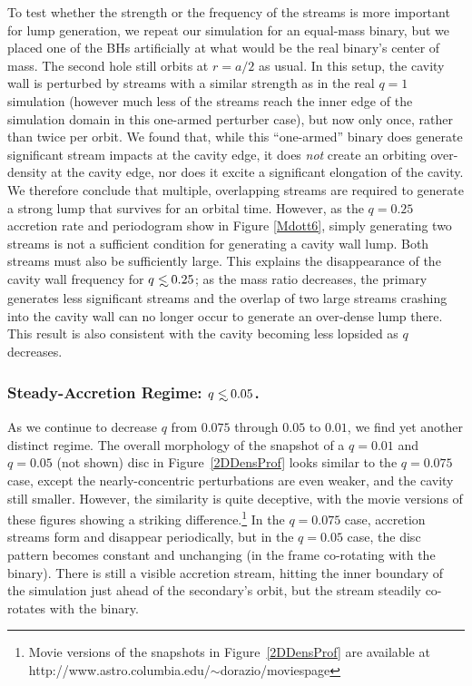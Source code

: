 To test whether the strength or the frequency of the streams is more
important for lump generation, we repeat our simulation for an
equal-mass binary, but we placed one of the BHs artificially at what
would be the real binary's center of mass. The second hole still
orbits at $r=a/2$ as usual.  In this setup, the cavity wall is
perturbed by streams with a similar strength as in the real $q=1$
simulation (however much less of the streams reach the inner edge 
of the simulation domain in this one-armed perturber case), but now only once, rather than twice per orbit. We found
that, while this ``one-armed'' binary does generate significant stream impacts at the cavity edge, it does {\em not} create an orbiting
over-density at the cavity edge, nor does it excite a significant
elongation of the cavity.  We therefore conclude that multiple,
overlapping streams are required to generate a strong lump that
survives for an orbital time. However, as the $q=0.25$ accretion rate and periodogram show in Figure \ref{Mdott6}, simply generating two streams is not a sufficient condition for generating a cavity wall lump. Both streams must also be sufficiently large.
This explains the disappearance of the cavity wall frequency for $q\lsim0.25$; as the mass ratio decreases, the primary generates less significant streams and the overlap of two large streams crashing into the cavity wall can no longer occur to generate an over-dense lump there.
This result is also consistent with the cavity becoming less lopsided as $q$ decreases.


\subsubsection{Steady-Accretion Regime: $q \lsim 0.05$.}
\label{Non-Variable Regime }

As we continue to decrease $q$ from $0.075$ through $0.05$ to $0.01$, we find yet another
distinct regime.  The overall morphology of the snapshot of a $q=0.01$ and $q=0.05$ (not shown)
disc in Figure~\ref{2DDensProf} looks similar to the $q=0.075$ case,
except the nearly-concentric perturbations are even weaker, and the
cavity still smaller.  However, the similarity is quite deceptive,
with the movie versions of these figures showing a striking
difference.\footnote{Movie versions of the snapshots in
  Figure~\ref{2DDensProf} are available at http://www.astro.columbia.edu/$\sim$dorazio/moviespage}
In the $q=0.075$ case, accretion streams form and disappear
periodically, but in the $q=0.05$ case, the disc pattern becomes
constant and unchanging (in the frame co-rotating with the binary).
There is still a visible accretion stream, hitting the inner boundary
of the simulation just ahead of the secondary's orbit, but the stream
steadily co-rotates with the binary.

